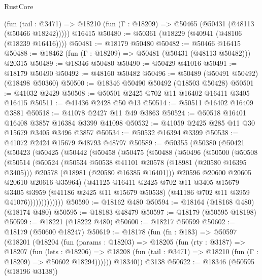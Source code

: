 \begin{lexlean}{RustCore}
\begin{coremodule}
    (fun (tail : @3471) => @18210 (fun (Γ : @18209) => @50465 (@50431 (@48113 (@50466 @18242)))))
    @16415
@50480 := @50361 (@18229 (@40941 (@48106 (@18239 @16416))))
@50481 := @18179 @50480
@50482 := @50466 @16415
@50488 := @18462 (fun (Γ : @18209) => @50481 (@50431 (@48113 @50482))) @20315
@50489 := @18346 @50480
@50490 := @50429 @41016
@50491 := @18179 @50490
@50492 := @48160 @50482
@50496 := @50489 (@50491 @50492) (@18498 @50360)
@50500 := @18346 @50490 @50492 (@18503 @50428)
@50501 := @41032 @2429
@50508 := @50501 @2425 @702 @11 @16402 @16411 @3405 @16415
@50511 := @41436 @2428 @50 @13
@50514 := @50511 @16402 @16409 @3881
@50518 := @41078 @2427 @11 @49 @3863
@50524 := @50518 @16401 @16408 @3857 @16384 @3399 @41098
@50532 := @41059 @2425 @285 @11 @30 @15679 @3405 @3496 @3857
@50534 := @50532 @16394 @3399
@50538 := @41072 @2424 @15679 @48793 @48797
@50589 := @50355
    (@50380
      (@50421
        (@50423
          (@50425
            (@50442
              (@50458
                (@50475
                  (@50488
                    (@50496
                      (@50500
                        (@50508
                          (@50514
                            (@50524
                              (@50534 @50538 @41101 @20578 (@18981 (@20580 @16395 @3405)))
                              @20578
                              (@18981 (@20580 @16385 @16401)))
                            @20596
                            @20600
                            @20605
                            @20610
                            @20616
                            @35964)
                          (@41125
                            @16411
                            @2425
                            @702
                            @11
                            @3405
                            @15679
                            @3405
                            @3959
                            (@41186 @2425 @11 @15679 @50538)
                            (@41186 @702 @11 @3959 @41076)))))))))))))
@50590 := @18162 @480
@50594 := @18164 (@18168 @480) (@18174 @480)
@50595 := @18183 @48479
@50597 := @18179 (@50595 @18198)
@50599 := @18221 (@18222 @480)
@50600 := @18217 @50599
@50602 := @18179 (@50600 @18247)
@50619 := @18178
    (fun (fn : @183) =>
    @50597
      (@18201
        (@18204
          (fun (params : @18203) =>
          @18205
            (fun (rty : @3187) =>
            @18207
              (fun (lets : @18206) =>
              @18208 (fun (tail : @3471) => @18210 (fun (Γ : @18209) => @50602 @18294))))))
        @18340))
    @3138
@50622 := @18346 (@50595 (@18196 @3138))

\end{coremodule}
\end{lexlean}
